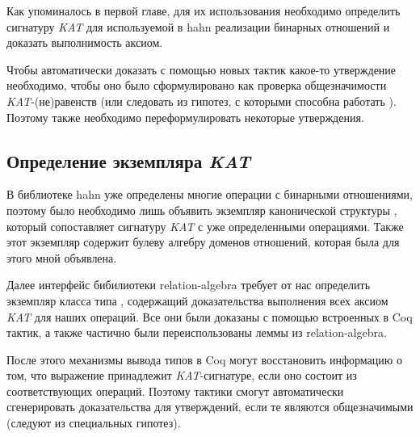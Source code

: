 \documentclass[times
              ]{itmo-student-thesis}
\begin{document}
    Как упоминалось в первой главе, для их использования необходимо определить сигнатуру \textit{KAT} для
    используемой в hahn реализации бинарных отношений и доказать выполнимость аксиом.

    Чтобы автоматически доказать с помощью новых тактик какое-то утверждение необходимо, чтобы оно было
    сформулировано как проверка общезначимости \textit{KAT}-(не)равенств (или следовать из гипотез, с которыми
    способна работать ).
    Поэтому также необходимо переформулировать некоторые утверждения.

    \subsection{Определение экземпляра \textit{KAT}}

      В библиотеке hahn уже определены многие операции с бинарными отношениями, поэтому было необходимо
      лишь объявить экземпляр канонической структуры , который сопоставляет сигнатуру
      \textit{KAT} с уже определенными операциями.
      Также этот экземпляр содержит булеву алгебру доменов отношений, которая была для этого мной
      объявлена.

      Далее интерфейс бибилиотеки relation-algebra требует от нас определить экземпляр класса типа
      , содержащий доказательства выполнения всех аксиом \textit{KAT} для наших операций.
      Все они были доказаны с помощью встроенных в Coq тактик, а также частично были переиспользованы
      леммы из relation-algebra.

      После этого механизмы вывода типов в Coq могут восстановить информацию о том, что выражение
      принадлежит \textit{KAT}-сигнатуре, если оно состоит из соответствующих операций.
      Поэтому тактики  смогут автоматически сгенерировать доказательства для
      утверждений, если те являются
      общезначимыми (следуют из специальных гипотез).

\end{document}
